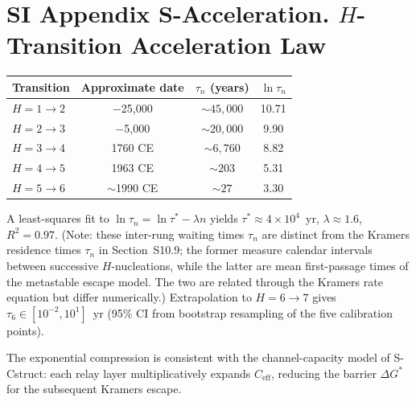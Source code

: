 \documentclass[11pt]{article}
\begin{document}
\section*{SI Appendix S-Acceleration. $H$-Transition Acceleration Law}

\begin{center}
\begin{tabular}{lccc}
\toprule
Transition & Approximate date & $\tau_n$ (years) & $\ln \tau_n$ \\
\midrule
$H=1\to 2$ & $-$25,000 & $\sim 45{,}000$ & 10.71 \\
$H=2\to 3$ & $-$5,000 & $\sim 20{,}000$ & 9.90 \\
$H=3\to 4$ & 1760 CE & $\sim 6{,}760$ & 8.82 \\
$H=4\to 5$ & 1963 CE & $\sim 203$ & 5.31 \\
$H=5\to 6$ & $\sim$1990 CE & $\sim 27$ & 3.30 \\
\bottomrule
\end{tabular}
\end{center}

A least-squares fit to $\ln \tau_n = \ln \tau^* - \lambda n$ yields $\tau^* \approx 4\times 10^4$~yr, $\lambda \approx 1.6$, $R^2 = 0.97$.
(Note: these inter-rung waiting times $\tau_n$ are distinct from the Kramers residence times $\tau_n$ in Section~S10.9; the former measure calendar intervals between successive $H$-nucleations, while the latter are mean first-passage times of the metastable escape model.
The two are related through the Kramers rate equation but differ numerically.)
Extrapolation to $H=6\to 7$ gives $\tau_6 \in [10^{-2}, 10^1]$~yr (95\% CI from bootstrap resampling of the five calibration points).

The exponential compression is consistent with the channel-capacity model of S-Cstruct: each relay layer multiplicatively expands $C_{\mathrm{eff}}$, reducing the barrier $\Delta G^*$ for the subsequent Kramers escape.

\end{document}
